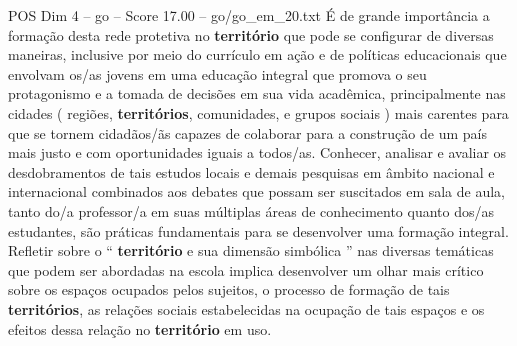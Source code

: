 \begin{textsample}{POS Dim 4 – go – Score 17.00 – go/go\_em\_20.txt}
É de grande importância a formação desta rede protetiva no \textbf{território} que pode se configurar de diversas maneiras, inclusive por meio do currículo em ação e de políticas educacionais que envolvam os/as jovens em uma educação integral que promova o seu protagonismo e a tomada de decisões em sua vida acadêmica, principalmente nas cidades ( regiões, \textbf{territórios}, comunidades, e grupos sociais ) mais carentes para que se tornem cidadãos/ãs capazes de colaborar para a construção de um país mais justo e com oportunidades iguais a todos/as.
Conhecer, analisar e avaliar os desdobramentos de tais estudos locais e demais pesquisas em âmbito nacional e internacional combinados aos debates que possam ser suscitados em sala de aula, tanto do/a professor/a em suas múltiplas áreas de conhecimento quanto dos/as estudantes, são práticas fundamentais para se desenvolver uma formação integral.
Refletir sobre o “ \textbf{território} e sua dimensão simbólica ” nas diversas temáticas que podem ser abordadas na escola implica desenvolver um olhar mais crítico sobre os espaços ocupados pelos sujeitos, o processo de formação de tais \textbf{territórios}, as relações sociais estabelecidas na ocupação de tais espaços e os efeitos dessa relação no \textbf{território} em uso.

\end{textsample}
